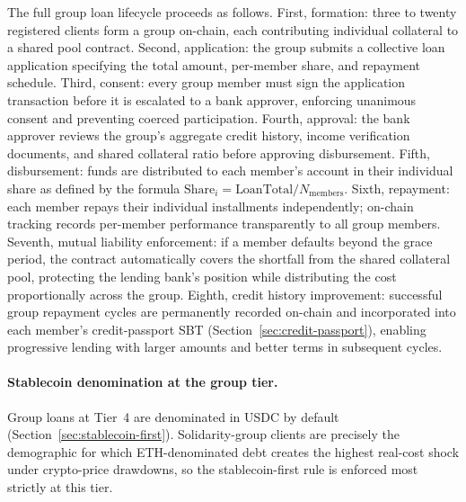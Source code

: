 \documentclass[12pt,a4paper]{report}
\begin{document}
The full group loan lifecycle proceeds as follows. First, formation: three to twenty registered clients form a group on-chain, each contributing individual collateral to a shared pool contract. Second, application: the group submits a collective loan application specifying the total amount, per-member share, and repayment schedule. Third, consent: every group member must sign the application transaction before it is escalated to a bank approver, enforcing unanimous consent and preventing coerced participation. Fourth, approval: the bank approver reviews the group's aggregate credit history, income verification documents, and shared collateral ratio before approving disbursement. Fifth, disbursement: funds are distributed to each member's account in their individual share as defined by the formula \(\text{Share}_i = \text{LoanTotal} / N_{\text{members}}\). Sixth, repayment: each member repays their individual installments independently; on-chain tracking records per-member performance transparently to all group members. Seventh, mutual liability enforcement: if a member defaults beyond the grace period, the contract automatically covers the shortfall from the shared collateral pool, protecting the lending bank's position while distributing the cost proportionally across the group. Eighth, credit history improvement: successful group repayment cycles are permanently recorded on-chain and incorporated into each member's credit-passport SBT (Section~\ref{sec:credit-passport}), enabling progressive lending with larger amounts and better terms in subsequent cycles.

\paragraph{Stablecoin denomination at the group tier.}
Group loans at Tier~4 are denominated in USDC by default (Section~\ref{sec:stablecoin-first}). Solidarity-group clients are precisely the demographic for which ETH-denominated debt creates the highest real-cost shock under crypto-price drawdowns, so the stablecoin-first rule is enforced most strictly at this tier.
\end{document}
